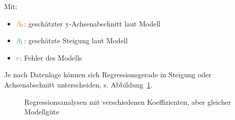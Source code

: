 \documentclass[
  letterpaper,
]{scrbook}
\providecommand{\tightlist}{%
  \setlength{\itemsep}{0pt}\setlength{\parskip}{0pt}}\usepackage{longtable,booktabs,array}
\theoremstyle{definition}
\theoremstyle{definition}
\theoremstyle{definition}
\theoremstyle{remark}
\begin{document}
Mit:

\begin{itemize}
\tightlist
\item
  \(\color{beta0col}{\beta_0}\): geschätzter y-Achsenabschnitt laut
  Modell
\item
  \(\color{beta1col}{\beta_1}\): geschätzte Steigung laut Modell
\item
  \(\color{errorcol}{\epsilon}\): Fehler des Modells
\end{itemize}

Je nach Datenlage können sich Regressionsgerade in Steigung oder
Achsenabschnitt unterscheiden, s. Abbildung~\ref{fig-regr-div}.

\begin{figure}

\begin{minipage}{0.50\linewidth}



\end{minipage}%
%
\begin{minipage}{0.50\linewidth}



\end{minipage}%

\caption{\label{fig-regr-div}Regressionsanalysen mit verschiedenen
Koeffizienten, aber gleicher Modellgüte}

\end{figure}%
\end{document}
